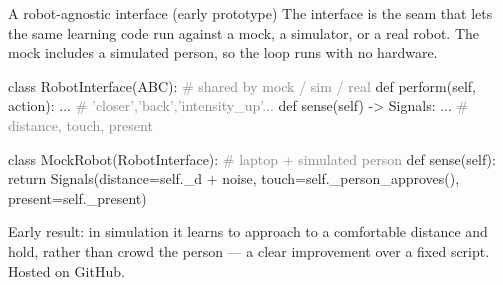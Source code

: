\documentclass[aspectratio=169,10pt]{beamer}
\begin{document}
\begin{frame}[fragile]{A robot-agnostic interface (early prototype)}
  \scriptsize
  The interface is the seam that lets the same learning code run against a mock, a simulator, or a real robot. The mock includes a simulated person, so the loop runs with no hardware.
\begin{semiverbatim}\scriptsize
class RobotInterface(ABC):           \textcolor{gray}{# shared by mock / sim / real}
    def perform(self, action): ...   \textcolor{gray}{# 'closer','back','intensity_up'...}
    def sense(self) -> Signals: ...  \textcolor{gray}{# {distance, touch, present}}

class MockRobot(RobotInterface):     \textcolor{gray}{# laptop + simulated person}
    def sense(self):
        return Signals(distance=self._d + noise,
                       touch=self._person_approves(),
                       present=self._present)
\end{semiverbatim}
  \vspace{-0.2em}
  Early result: in simulation it learns to approach to a comfortable distance and hold, rather than crowd the person --- a clear improvement over a fixed script. Hosted on GitHub.
\end{frame}
\end{document}
